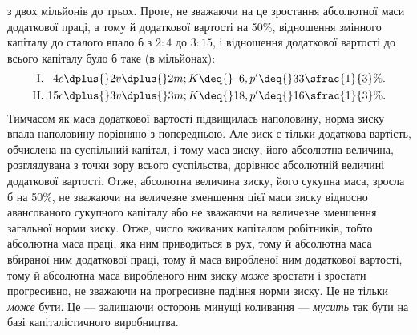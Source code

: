 \parcont{}  %
з двох мільйонів до трьох. Проте, не зважаючи на це зростання
абсолютної маси додаткової праці, а тому й додаткової
вартості на 50\%, відношення змінного капіталу до сталого
впало б з $2 : 4$ до $3 : 15$, і відношення додаткової вартості до
всього капіталу було б таке (в мільйонах):
\begin{gather*}
\text{\phantom{I}I. }\phantom{1}4c \dplus{} 2v \dplus{} 2m; K \deq{} \phantom{1}6, p' \deq{} 33\sfrac{1}{3}\%.\\
\text{II. }15c \dplus{} 3v \dplus{} 3m; K \deq{} 18, p' \deq{} 16\sfrac{1}{3}\%.
\end{gather*}
\noindent{}Тимчасом як маса додаткової вартості підвищилась наполовину,
норма зиску впала наполовину порівняно з попередньою.
Але зиск є тільки додаткова вартість, обчислена на суспільний
капітал, і тому маса зиску, його абсолютна величина, розглядувана
з точки зору всього суспільства, дорівнює абсолютній величині
додаткової вартості. Отже, абсолютна величина зиску, його
сукупна маса, зросла б на 50\%, не зважаючи на величезне зменшення
цієї маси зиску відносно авансованого сукупного капіталу
або не зважаючи на величезне зменшення загальної норми зиску.
Отже, число вживаних капіталом робітників, тобто абсолютна
маса праці, яка ним приводиться в рух, тому й абсолютна маса
вбираної ним додаткової праці, тому й маса виробленої ним додаткової
вартості, тому й абсолютна маса виробленого ним зиску
\emph{може} зростати і зростати прогресивно, не зважаючи на прогресивне
падіння норми зиску. Це не тільки \emph{може} бути. Це — залишаючи
осторонь минущі коливання — \emph{мусить} так бути на базі
капіталістичного виробництва.

